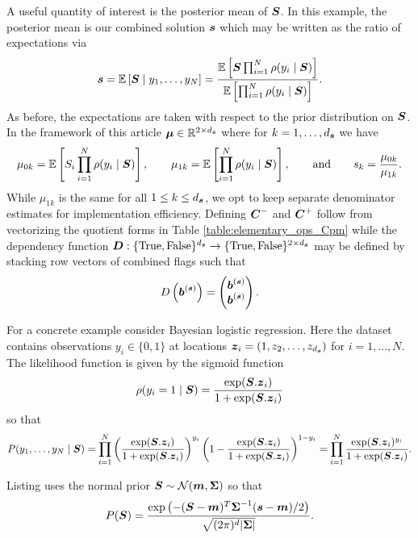 \documentclass{article}[12pt]
\begin{document}
A useful quantity of interest is the posterior mean of $\boldsymbol{S}$. In this example, the posterior mean is our combined solution $\boldsymbol{s}$ which may be written as the ratio of expectations via
$$\boldsymbol{s} = \mathbb{E}\left[\boldsymbol{S} \mid y_1,\dots,y_{N}\right] = \frac{\mathbb{E}\left[\boldsymbol{S} \prod_{i=1}^{N} \rho(y_i \mid \boldsymbol{S})\right]}{\mathbb{E}\left[\prod_{i=1}^{N} \rho(y_i \mid \boldsymbol{S})\right]}.$$
As before, the expectations are taken with respect to the prior distribution on $\boldsymbol{S}$. In the framework of this article $\boldsymbol{\mu} \in \mathbb{R}^{2 \times d_{\boldsymbol{s}}}$ where for $k=1,\dots,d_{\boldsymbol{s}}$ we have 
$$\mu_{0k} = \mathbb{E}\left[S_i \prod_{i=1}^{N} \rho(y_i \mid \boldsymbol{S})\right], \qquad \mu_{1k} = \mathbb{E}\left[\prod_{i=1}^{N} \rho(y_i \mid \boldsymbol{S})\right], \qquad \text{and} \qquad s_k = \frac{\mu_{0k}}{\mu_{1k}}.$$
While $\mu_{1k}$ is the same for all $1 \leq k \leq d_{\boldsymbol{s}}$, we opt to keep separate denominator estimates for implementation efficiency. Defining $\boldsymbol{C}^-$ and $\boldsymbol{C}^+$ follow from vectorizing the quotient forms in Table \ref{table:elementary_ops_Cpm} while the dependency function $\boldsymbol{D}: \{\text{True},\text{False}\}^{d_{\boldsymbol{s}}} \to \{\text{True},\text{False}\}^{2 \times d_{\boldsymbol{s}}}$ may be defined by stacking row vectors of combined flags such that
$$D\left(\boldsymbol{b}^{(\boldsymbol{s})}\right) = \begin{pmatrix} \boldsymbol{b}^{(\boldsymbol{s})} \\ \boldsymbol{b}^{(\boldsymbol{s})} \end{pmatrix}.$$

For a concrete example consider Bayesian logistic regression. Here the dataset contains observations $y_i \in \{0,1\}$ at locations $\boldsymbol{z}_i = \left(1,z_2,\dots,z_{d_{\boldsymbol{s}}}\right)$ for $i=1,\dots,N$. The likelihood function is given by the sigmoid function
$$\rho(y_i = 1 \mid \boldsymbol{S}) = \frac{\exp(\boldsymbol{S}.\boldsymbol{z}_i)}{1+\exp(\boldsymbol{S}.\boldsymbol{z}_i)}$$
so that
$$P(y_1,\dots,y_N \mid \boldsymbol{S}) = \prod_{i=1}^N \left(\frac{\exp(\boldsymbol{S}.\boldsymbol{z}_i)}{1+\exp(\boldsymbol{S}.\boldsymbol{z}_i)}\right)^{y_i} \left(1-\frac{\exp(\boldsymbol{S}.\boldsymbol{z}_i)}{1+\exp(\boldsymbol{S}.\boldsymbol{z}_i)}\right)^{1-y_i} = \prod_{i=1}^N \frac{\exp(\boldsymbol{S}.\boldsymbol{z}_i)^{y_i}}{1+\exp(\boldsymbol{S}.\boldsymbol{z}_i)}.$$

Listing  uses the normal prior $\boldsymbol{S} \sim \mathcal{N}(\boldsymbol{m},\boldsymbol{\Sigma})$ so that
$$P(\boldsymbol{S}) = \frac{\exp\left(-(\boldsymbol{S}-\boldsymbol{m})^T\boldsymbol{\Sigma}^{-1}(\boldsymbol{s}-\boldsymbol{m})/2\right)}{\sqrt{(2\pi)^d\lvert \boldsymbol{\Sigma} \rvert}}.$$



\end{document}
